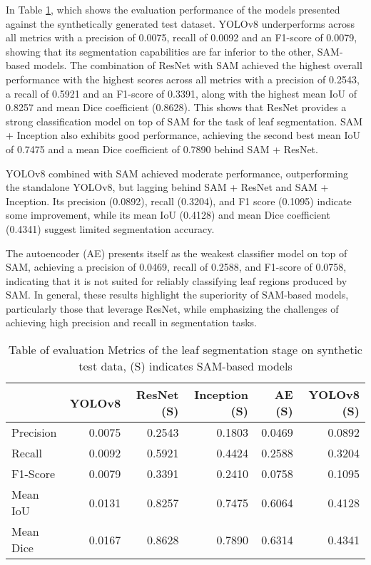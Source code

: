 \documentclass[draft,final]{vutinfth} %
\begin{document}
In Table \ref{tab:metrics_segmentation_synthetic}, which shows the evaluation performance of the models presented against the synthetically generated test dataset. 
YOLOv8 underperforms across all metrics with a precision of 0.0075, recall of 0.0092 and an F1-score of 0.0079, showing that its segmentation capabilities are far inferior to the other, SAM-based models. The combination of ResNet with SAM achieved the highest overall performance with the highest scores across all metrics with a precision of 0.2543, a recall of 0.5921 and an F1-score of 0.3391, along with the highest mean IoU of 0.8257 and mean Dice coefficient (0.8628). This shows that ResNet provides a strong classification model on top of SAM for the task of leaf segmentation.
SAM + Inception also exhibits good performance, achieving the second best mean IoU of 0.7475 and a mean Dice coefficient of 0.7890 behind SAM + ResNet. 

YOLOv8 combined with SAM achieved moderate performance, outperforming the standalone YOLOv8, but lagging behind SAM + ResNet and SAM + Inception. Its precision (0.0892), recall (0.3204), and F1 score (0.1095) indicate some improvement, while its mean IoU (0.4128) and mean Dice coefficient (0.4341) suggest limited segmentation accuracy.

The autoencoder (AE) presents itself as the weakest classifier model on top of SAM, achieving a precision of 0.0469, recall of 0.2588, and F1-score of 0.0758, indicating that it is not suited for reliably classifying leaf regions produced by SAM. In general, these results highlight the superiority of SAM-based models, particularly those that leverage ResNet, while emphasizing the challenges of achieving high precision and recall in segmentation tasks.

\begin{table}[]
    \centering
    \begin{tabular}{lrrrrr}
    \toprule
     & YOLOv8 & ResNet (S) & Inception (S) & AE (S) & YOLOv8 (S) \\
    \midrule
    Precision & 0.0075 & 0.2543 & 0.1803 & 0.0469 & 0.0892 \\
    Recall & 0.0092 & 0.5921 & 0.4424 & 0.2588 & 0.3204 \\
    F1-Score & 0.0079 & 0.3391 & 0.2410 & 0.0758 & 0.1095 \\
    Mean IoU & 0.0131 & 0.8257 & 0.7475 & 0.6064 & 0.4128 \\
    Mean Dice & 0.0167 & 0.8628 & 0.7890 & 0.6314 & 0.4341 \\
    \bottomrule
    \end{tabular}
    \caption{Table of evaluation Metrics of the leaf segmentation stage on synthetic test data, (S) indicates SAM-based models}
    \label{tab:metrics_segmentation_synthetic}
\end{table}
\end{document}
